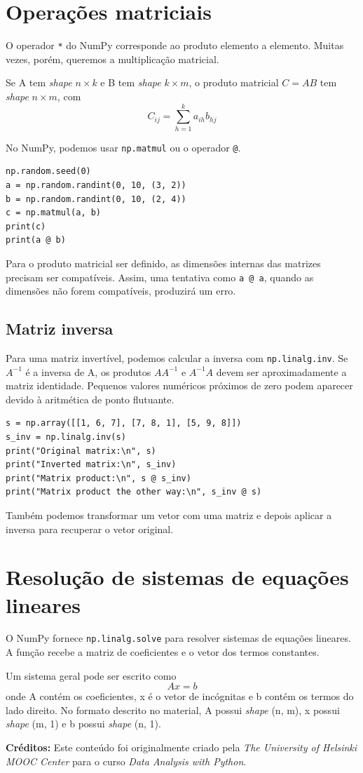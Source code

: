 \documentclass[11pt,a4paper]{article}
\begin{document}
\section{Operações matriciais}

O operador \texttt{*} do NumPy corresponde ao produto elemento a elemento. Muitas vezes, porém, queremos a multiplicação matricial.

Se A tem \textit{shape} $n \times k$ e B tem \textit{shape} $k \times m$, o produto matricial $C = AB$ tem \textit{shape} $n \times m$, com
\[ C_{ij} = \sum_{h=1}^{k} a_{ih}b_{hj} \]

No NumPy, podemos usar \texttt{np.matmul} ou o operador \texttt{@}.

\begin{lstlisting}
np.random.seed(0)
a = np.random.randint(0, 10, (3, 2))
b = np.random.randint(0, 10, (2, 4))
c = np.matmul(a, b)
print(c)
print(a @ b)
\end{lstlisting}

Para o produto matricial ser definido, as dimensões internas das matrizes precisam ser compatíveis. Assim, uma tentativa como \texttt{a @ a}, quando as dimensões não forem compatíveis, produzirá um erro.

\subsection{Matriz inversa}

Para uma matriz invertível, podemos calcular a inversa com \texttt{np.linalg.inv}. Se $A^{-1}$ é a inversa de A, os produtos $A A^{-1}$ e $A^{-1} A$ devem ser aproximadamente a matriz identidade. Pequenos valores numéricos próximos de zero podem aparecer devido à aritmética de ponto flutuante.

\begin{lstlisting}
s = np.array([[1, 6, 7], [7, 8, 1], [5, 9, 8]])
s_inv = np.linalg.inv(s)
print("Original matrix:\n", s)
print("Inverted matrix:\n", s_inv)
print("Matrix product:\n", s @ s_inv)
print("Matrix product the other way:\n", s_inv @ s)
\end{lstlisting}

Também podemos transformar um vetor com uma matriz e depois aplicar a inversa para recuperar o vetor original.

\section{Resolução de sistemas de equações lineares}

O NumPy fornece \texttt{np.linalg.solve} para resolver sistemas de equações lineares. A função recebe a matriz de coeficientes e o vetor dos termos constantes.

Um sistema geral pode ser escrito como
\[ Ax = b \]
onde A contém os coeficientes, x é o vetor de incógnitas e b contém os termos do lado direito. No formato descrito no material, A possui \textit{shape} (n, m), x possui \textit{shape} (m, 1) e b possui \textit{shape} (n, 1).

\vspace{2em}
\noindent\textbf{Créditos:} Este conteúdo foi originalmente criado pela \textit{The University of Helsinki MOOC Center} para o curso \textit{Data Analysis with Python}.
\end{document}
